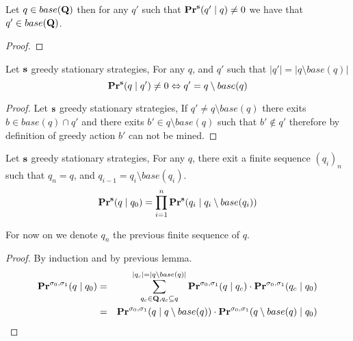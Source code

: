 \begin{mylem}
	\label{lem2}
	Let $q \in base(\mathbf{Q})$ then for any $q'$ such that $\mathbf{Pr}^{\mathbf{s}}(q' \mid q) \neq 0$ we have that $q' \in base(\mathbf{Q})$.
\end{mylem}
\begin{proof}
\end{proof}

\begin{mylem}
	\label{lem3}
	Let $\mathbf{s}$ greedy stationary strategies,
	For any $q$, and $q'$ such that $|q'| = |q \setminus base(q)|$
	$$\mathbf{Pr}^{\mathbf{s}}(q \mid q') \neq 0 \Leftrightarrow q' = q \setminus base(q)$$
\end{mylem}
\begin{proof}
	Let $\mathbf{s}$ greedy stationary strategies, If $q' \neq q \setminus base(q)$ there exits $b \in base(q) \cap q'$ and there exits $b' \in q \setminus base(q)$ such that $b' \notin q'$ therefore by definition of greedy action $b'$ can not be mined.
\end{proof}

\begin{mylem}
	Let $\mathbf{s}$ greedy stationary strategies,
	For any $q$, there exit a finite sequence $(q_i)_{n}$ such that $q_n = q$, and $q_{i-1} = q_i \setminus base(q_i)$.
	$$\mathbf{Pr}^{\mathbf{s}}(q \mid q_0) = \prod_{i = 1}^{n}\mathbf{Pr}^{\mathbf{s}}(q_i \mid q_{i} \setminus base(q_{i}))$$
\end{mylem}
For now on we denote $q_n$ the previous finite sequence of $q$.
\begin{proof}
	By induction and by previous lemma.
\begin{eqnarray*}
	\mathbf{Pr}^{\sigma_0,\sigma_1}(q \mid q_0) & = & \sum_{q_c \in \mathbf{Q}, q_c \subseteq q}^{|q_c| = |q \setminus base(q)|} \mathbf{Pr}^{\sigma_0,\sigma_1}(q \mid q_c) \cdot  	\mathbf{Pr}^{\sigma_0,\sigma_1}(q_c \mid q_0)	\\
	&=& \mathbf{Pr}^{\sigma_0,\sigma_1}(q \mid q \setminus base(q)) \cdot \mathbf{Pr}^{\sigma_0,\sigma_1}(q \setminus base(q) \mid q_0) \\
\end{eqnarray*}

\end{proof}

